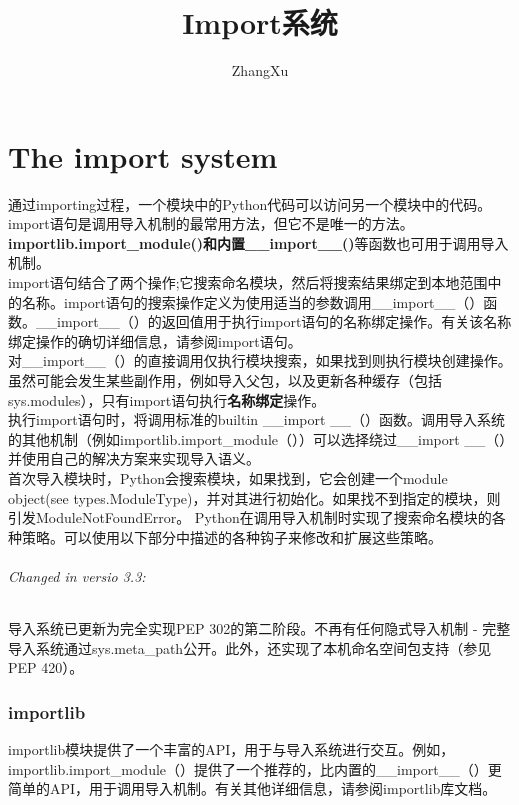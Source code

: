 \documentclass[10pt,UTF8]{ctexart}
\title{Import系统}
\author{ZhangXu}
\begin{document}
\maketitle
\part{The import system}
通过importing过程，一个模块中的Python代码可以访问另一个模块中的代码。import语句是调用导入机制的最常用方法，但它不是唯一的方法。 \textbf{importlib.import_module()和内置__import__()}等函数也可用于调用导入机制。\\
\indent import语句结合了两个操作;它搜索命名模块，然后将搜索结果绑定到本地范围中的名称。import语句的搜索操作定义为使用适当的参数调用__import__（）函数。__import__（）的返回值用于执行import语句的名称绑定操作。有关该名称绑定操作的确切详细信息，请参阅import语句。\\
\indent 对__import__（）的直接调用仅执行模块搜索，如果找到则执行模块创建操作。
虽然可能会发生某些副作用，例如导入父包，以及更新各种缓存（包括sys.modules），只有import语句执行\textbf{名称绑定}操作。\\
\indent 执行import语句时，将调用标准的builtin __import __（）函数。调用导入系统的其他机制（例如importlib.import_module（））可以选择绕过__import __（）并使用自己的解决方案来实现导入语义。\\
\indent 首次导入模块时，Python会搜索模块，如果找到，它会创建一个module object(see types.ModuleType)，并对其进行初始化。如果找不到指定的模块，则引发ModuleNotFoundError。 Python在调用导入机制时实现了搜索命名模块的各种策略。可以使用以下部分中描述的各种钩子来修改和扩展这些策略。
\paragraph{Changed in versio 3.3:}导入系统已更新为完全实现PEP 302的第二阶段。不再有任何隐式导入机制 - 完整导入系统通过sys.meta_path公开。此外，还实现了本机命名空间包支持（参见PEP 420）。
\section{importlib}
importlib模块提供了一个丰富的API，用于与导入系统进行交互。例如，importlib.import_module（）提供了一个推荐的，比内置的__import__（）更简单的API，用于调用导入机制。有关其他详细信息，请参阅importlib库文档。
\end{document}
